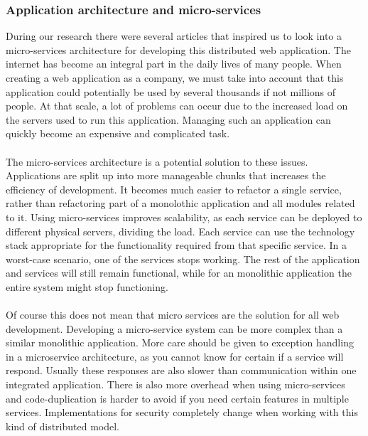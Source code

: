 \documentclass[12pt]{article}
\begin{document}
\begin{multicols}{2}
\subsubsection{Application architecture and micro-services}
During our research there were several articles that inspired us to look into a micro-services architecture for developing this distributed web application. \cite{ApiGateway28:online} \cite{MicroservicesApiGateway87:online} \cite{MicroservicesFrameworks85:online} The internet has become an integral part in the daily lives of many people. When creating a web application as a company, we must take into account that this application could potentially be used by several thousands if not millions of people. At that scale, a lot of problems can occur due to the increased load on the servers used to run this application. Managing such an application can quickly become an expensive and complicated task. 
\\\\
The micro-services architecture is a potential solution to these issues. Applications are split up into more manageable chunks that increases the efficiency of development. It becomes much easier to refactor a single service, rather than refactoring part of a monolothic application and all modules related to it. Using micro-services improves scalability, as each service can be deployed to different physical servers, dividing the load. Each service can use the technology stack appropriate for the functionality required from that specific service. In a worst-case scenario, one of the services stops working. The rest of the application and services will still remain functional, while for an monolithic application the entire system might stop functioning. \cite{MicroservicesProandCons72:online}
\\\\
Of course this does not mean that micro services are the solution for all web development. Developing a micro-service system can be more complex than a similar monolithic application. More care should be given to exception handling in a microservice architecture, as you cannot know for certain if a service will respond. Usually these responses are also slower than communication within one integrated application. There is also more overhead when using micro-services and code-duplication is harder to avoid if you need certain features in multiple services. Implementations for security completely change when working with this kind of distributed model. 
\\\\

\end{multicols}
\end{document}
